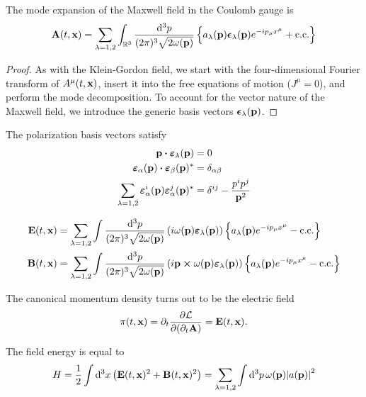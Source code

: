 \begin{theorem}
	The mode expansion of the Maxwell field in the Coulomb gauge is
	\begin{equation}
		\vb{A}(t,\vb{x})
		=
		\sum_{\lambda=1,2}
		\int_{\mathbb{R}^3}\frac{\dd[3]{p}}{(2\pi)^3\sqrt{2\omega(\vb{p})}}
		\left\{
			a_\lambda(\vb{p})
			\boldsymbol{\epsilon}_\lambda(\vb{p})
			e^{-ip_\mu x^\mu}
			+
			\text{c.c.}
		\right\}
		\label{eq:mw_ft}
	\end{equation}
\end{theorem}
\begin{proof}
	As with the Klein-Gordon field, we start with the four-dimensional Fourier transform of $A^\mu(t,\vb{x})$, insert it into the free equations of motion ($J^\mu=0$), and perform the mode decomposition.
	To account for the vector nature of the Maxwell field, we introduce the generic basis vectors $\boldsymbol{\epsilon}_\lambda(\vb{p})$.
\end{proof}
\begin{theorem}
	The polarization basis vectors satisfy~\cite[p.~341]{Srednicki2007}
	\begin{align}
		\vb{p}
		\vdot
		\boldsymbol{\varepsilon}_\lambda(\vb{p})
		&=
		0
		\\
		\boldsymbol{\varepsilon}_\alpha(\vb{p})
		\vdot
		\boldsymbol{\varepsilon}_\beta(\vb{p})^*
		&=
		\delta_{\alpha\beta}
		\\
		\sum_{\lambda=1,2}
		\boldsymbol{\varepsilon}_\alpha^i(\vb{p})
		\boldsymbol{\varepsilon}_\alpha^j(\vb{p})^*
		&=
		\delta^{ij}
		-
		\frac{p^ip^j}{\vb{p}^2}
	\end{align}
\end{theorem}
\begin{theorem}
	\begin{align}
		\vb{E}(t,\vb{x})
		&=
		\sum_{\lambda=1,2}
		\int\frac{\dd[3]{p}}{(2\pi)^3\sqrt{2\omega(\vb{p})}}
		\left(
			i\omega(\vb{p})
			\boldsymbol{\varepsilon}_\lambda(\vb{p})
		\right)
		\left\{
			a_\lambda(\vb{p})
			e^{-ip_\mu x^\mu}
			-
			\text{c.c.}
		\right\}
		\\
		\vb{B}(t,\vb{x})
		&=
		\sum_{\lambda=1,2}
		\int\frac{\dd[3]{p}}{(2\pi)^3\sqrt{2\omega(\vb{p})}}
		\left(
			i\vb{p}\cross\omega(\vb{p})
			\boldsymbol{\varepsilon}_\lambda(\vb{p})
		\right)
		\left\{
			a_\lambda(\vb{p})
			e^{-ip_\mu x^\mu}
			-
			\text{c.c.}
		\right\}
	\end{align}
\end{theorem}
\begin{lemma}
	The canonical momentum density turns out to be the electric field
	\begin{equation}
		\pi(t,\vb{x})
		=
		\partial_t\pdv{\mathcal{L}}{(\partial_t\vb{A})}
		=
		\vb{E}(t,\vb{x})
		\label{eq:mw_mom}.
	\end{equation}
\end{lemma}
\begin{lemma}\label{thm:mw_energy}
	The field energy is equal to
	\begin{equation}
		H
		=
		\frac{1}{2}
		\int\dd[3]{x}
		\left(
			\vb{E}(t,\vb{x})^2
			+
			\vb{B}(t,\vb{x})^2
		\right)
		=
		\sum_{\lambda=1,2}
		\int\dd[3]{p}
		\omega(\vb{p})
		\abs{a(\vb{p})}^2
	\end{equation}
\end{lemma}